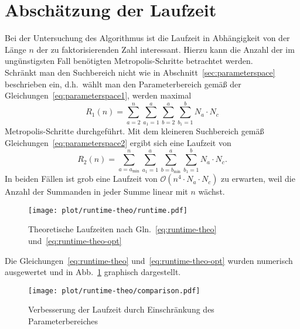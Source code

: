 

\FloatBarrier{}



\section{Abschätzung der Laufzeit}\label{sec:runtime-theo}
Bei der Untersuchung des Algorithmus ist die Laufzeit in Abhängigkeit von der Länge $n$ der zu faktorisierenden Zahl interessant. Hierzu kann die Anzahl der im ungünstigsten Fall benötigten Metropolis-Schritte betrachtet werden. \\
Schränkt man den Suchbereich nicht wie in Abschnitt~\ref{sec:parameterspace} beschrieben ein, d.h.\ wählt man den Parameterbereich gemäß der Gleichungen~\eqref{eq:parameterspace1}, werden maximal
\begin{equation}
		R_1\left(n\right)=\sum\limits_{a=2}^{n}\sum\limits_{a_1=1}^{a}\sum\limits_{b=2}^{a}\sum\limits_{b_1=1}^{b}N_a\cdot N_c\label{eq:runtime-theo}
\end{equation}
Metropolis-Schritte durchgeführt. Mit dem kleineren Suchbereich gemäß Gleichungen~\eqref{eq:parameterspace2} ergibt sich eine Laufzeit von
\begin{equation}
		R_2\left(n\right)=\sum\limits_{a=a_\mathrm{\min}}^{n}\sum\limits_{a_1=1}^{a}\sum\limits_{b=b_\mathrm{\min}}^{a}\sum\limits_{b_1=1}^{b}N_a\cdot N_c\label{eq:runtime-theo-opt}.
\end{equation}
In beiden Fällen ist grob eine Laufzeit von $\mathcal{O}\left(n^4\cdot N_a\cdot N_c\right)$ zu erwarten, weil die Anzahl der Summanden in jeder Summe linear mit $n$ wächst. \\

\begin{figure}[!ht]
		\centering
		\texttt{[image: plot/runtime-theo/runtime.pdf]}
		\caption{Theoretische Laufzeiten nach Gln.~\eqref{eq:runtime-theo} und~\eqref{eq:runtime-theo-opt}}\label{fig:runtime-theo}
\end{figure}

Die Gleichungen~\eqref{eq:runtime-theo} und~\eqref{eq:runtime-theo-opt} wurden numerisch ausgewertet und in Abb.~\ref{fig:runtime-theo} graphisch dargestellt.\\

\begin{figure}[!ht]
		\centering
		\texttt{[image: plot/runtime-theo/comparison.pdf]}
		\caption{Verbesserung der Laufzeit durch Einschränkung des Parameterbereiches}\label{fig:runtime-theo-comparison}
\end{figure}

